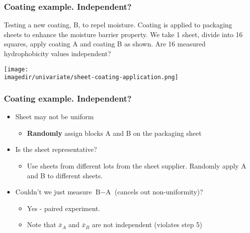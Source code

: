 \begin{frame}\frametitle{{\color{myOrange}{Side discussion:}} Coating example. Independent?}

	Testing a new coating, B, to repel moisture. Coating is applied to packaging sheets to enhance the moisture barrier property. We take 1 sheet, divide into 16 squares, apply coating A and coating B as shown. Are 16 measured hydrophobicity values independent?
	\begin{center}
		\texttt{[image: \\imagedir/univariate/sheet-coating-application.png]}
	\end{center}
\end{frame}

\begin{frame}\frametitle{{\color{myOrange}{Side discussion:}} Coating example. Independent?}
	\begin{itemize}
		\item	Sheet may not be uniform
		\begin{itemize}
			\item	\textbf{Randomly} assign blocks A and B on the packaging sheet
		\end{itemize}
		\item	Is the sheet representative?
		\begin{itemize}
			\item	Use sheets from different lots from the sheet supplier. Randomly apply A and B to different sheets.
		\end{itemize}
		\item	Couldn't we just measure $\text{B} - \text{A}$ (cancels out non-uniformity)?
		\begin{itemize}
			\item	Yes - paired experiment.
			\item	Note that $\bar{x}_A$ and $\bar{x}_B$ are not independent (violates step 5)
		\end{itemize}
	\end{itemize}
\end{frame}

